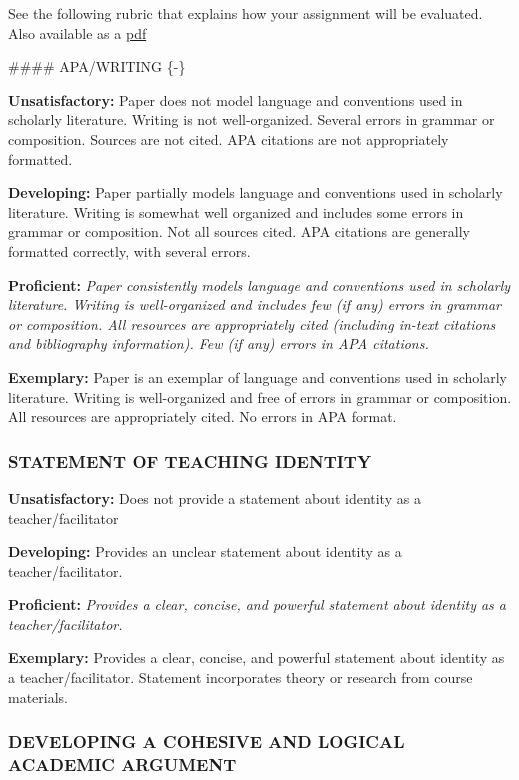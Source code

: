 \documentclass[
]{book}
\begin{document}
See the following rubric that explains how your assignment will be evaluated. Also available as a \href{assets/assessment/Identity-as-a-Teacher-RUBRIC.pdf}{pdf}

\#\#\#\# APA/WRITING \{-\}

\textbf{Unsatisfactory:} Paper does not model language and conventions used in scholarly literature. Writing is not well-organized. Several errors in grammar or composition. Sources are not cited. APA citations are not appropriately formatted.

\textbf{Developing:} Paper partially models language and conventions used in scholarly literature. Writing is somewhat well organized and includes some errors in grammar or composition. Not all sources cited. APA citations are generally formatted correctly, with several errors.

\textbf{Proficient:} \emph{Paper consistently models language and conventions used in scholarly literature. Writing is well-organized and includes few (if any) errors in grammar or composition. All resources are appropriately cited (including in-text citations and bibliography information). Few (if any) errors in APA citations.}

\textbf{Exemplary:} Paper is an exemplar of language and conventions used in scholarly literature. Writing is well-organized and free of errors in grammar or composition. All resources are appropriately cited. No errors in APA format.

\hypertarget{statement-of-teaching-identity}{%
\subsubsection*{STATEMENT OF TEACHING IDENTITY}\label{statement-of-teaching-identity}}

\textbf{Unsatisfactory:} Does not provide a statement about identity as a teacher/facilitator

\textbf{Developing:} Provides an unclear statement about identity as a teacher/facilitator.

\textbf{Proficient:} \emph{Provides a clear, concise, and powerful statement about identity as a teacher/facilitator.}

\textbf{Exemplary:} Provides a clear, concise, and powerful statement about identity as a teacher/facilitator. Statement incorporates theory or research from course materials.

\hypertarget{developing-a-cohesive-and-logical-academic-argument}{%
\subsubsection*{DEVELOPING A COHESIVE AND LOGICAL ACADEMIC ARGUMENT}\label{developing-a-cohesive-and-logical-academic-argument}}
\end{document}
